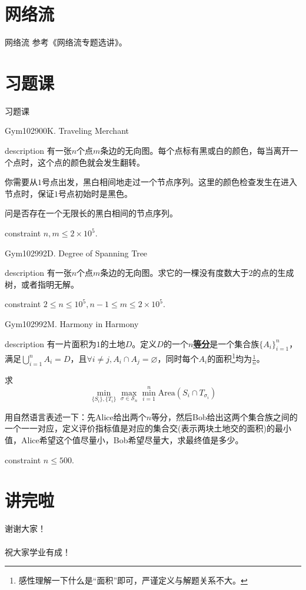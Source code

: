 \documentclass{beamer}
\def\obj#1{\textbf{\uline{#1}}}
\def\le{\leqslant}
\begin{document}
\section{网络流}
\begin{frame}{网络流}
	参考《网络流专题选讲》。
\end{frame}
\section{习题课}
\begin{frame}
	\begin{center}
		{\huge 习题课}
	\end{center}
\end{frame}
\begin{frame}{Gym102900K. Traveling Merchant}
	\begin{block}{description}
		有一张$n$个点$m$条边的无向图。每个点标有黑或白的颜色，每当离开一个点时，这个点的颜色就会发生翻转。

		你需要从$1$号点出发，黑白相间地走过一个节点序列。这里的颜色检查发生在进入节点时，保证$1$号点初始时是黑色。

		问是否存在一个无限长的黑白相间的节点序列。
	\end{block}
	\begin{block}{constraint}
		$n, m \le 2 \times 10^5.$
	\end{block}
\end{frame}
\begin{frame}{Gym102992D. Degree of Spanning Tree}
	\begin{block}{description}
		有一张$n$个点$m$条边的无向图。求它的一棵没有度数大于$2$的点的生成树，或者指明无解。
	\end{block}
	\begin{block}{constraint}
		$2 \le n \le 10^5, n - 1 \le m \le 2 \times 10^5.$
	\end{block}
\end{frame}
\begin{frame}{Gym102992M. Harmony in Harmony}
	\begin{block}{description}
		有一片面积为$1$的土地$D$。定义$D$的一个\obj{$n$等分}是一个集合族$\{A_i\}_{i=1}^{n}$，满足$\bigcup_{i=1}^{n}A_i = D$，且$\forall i \neq j, A_i \cap A_j = \varnothing$，同时每个$A_i$的面积\footnote{\tiny 感性理解一下什么是“面积”即可，严谨定义与解题关系不大。}均为$\frac 1n$。

		求$$\min_{\{S_i\}, \{T_i\}} \max_{\sigma \in \mathcal S_n} \min_{i=1}^{n} \mathrm{Area}(S_i \cap T_{\sigma_i})$$

		{\tiny 用自然语言表述一下：先Alice给出两个$n$等分，然后Bob给出这两个集合族之间的一个一一对应，定义评价指标值是对应的集合交(表示两块土地交的面积)的最小值，Alice希望这个值尽量小，Bob希望尽量大，求最终值是多少。}
	\end{block}
	\begin{block}{constraint}
		$n \le 500.$
	\end{block}
\end{frame}
\section{讲完啦}
\begin{frame}
	\begin{center}
		{\huge 谢谢大家！\\~\\  \large 祝大家学业有成！}
	\end{center}
\end{frame}
\end{document}
